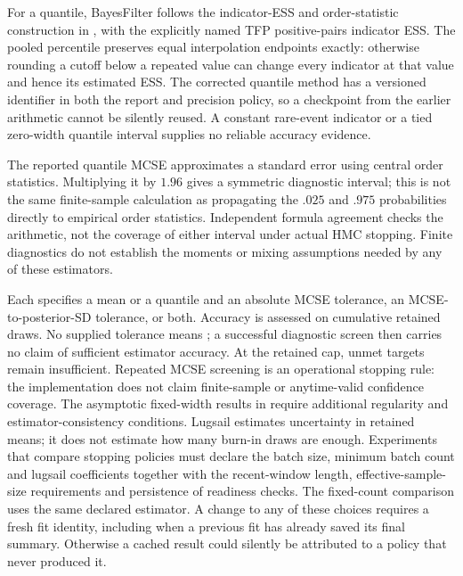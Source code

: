 For a quantile, BayesFilter follows the indicator-ESS and order-statistic
construction in \citet[section 4.4]{vehtari2021rank}, with the explicitly named
TFP positive-pairs indicator ESS. The pooled percentile preserves equal
interpolation endpoints exactly: otherwise rounding a cutoff below a repeated
value can change every indicator at that value and hence its estimated ESS.
The corrected quantile method has a versioned identifier in both the report
and precision policy, so a checkpoint from the earlier arithmetic cannot be
silently reused. A constant rare-event indicator or a tied zero-width quantile
interval supplies no reliable accuracy evidence.

The reported quantile MCSE approximates a standard error using central
order statistics. Multiplying it by $1.96$ gives a symmetric diagnostic
interval; this is not the same finite-sample calculation as propagating the
$.025$ and $.975$ probabilities directly to empirical order statistics.
Independent formula agreement checks the arithmetic, not the coverage of
either interval under actual HMC stopping. Finite diagnostics do not establish
the moments or mixing assumptions needed by any of these estimators.

Each  specifies a mean or a quantile and an absolute
MCSE tolerance, an MCSE-to-posterior-SD tolerance, or both. Accuracy is assessed
on cumulative retained draws. No supplied tolerance means
; a successful diagnostic screen then carries
no claim of sufficient estimator accuracy. At the retained cap, unmet targets
remain insufficient. Repeated MCSE screening is an operational stopping rule:
the implementation does not claim finite-sample or anytime-valid confidence
coverage. The asymptotic fixed-width results in
\citet[sections 2--3.1 and Appendix A]{flegalgongfixedwidth} require additional
regularity and estimator-consistency conditions. Lugsail estimates uncertainty
in retained means; it does not estimate how many burn-in draws are enough.
Experiments that compare stopping policies must declare the batch size,
minimum batch count and lugsail coefficients together with the recent-window
length, effective-sample-size requirements and persistence of readiness checks.
The fixed-count comparison uses the same declared estimator. A change to any
of these choices requires a fresh fit identity, including when a previous fit
has already saved its final summary. Otherwise a cached result could silently
be attributed to a policy that never produced it.

